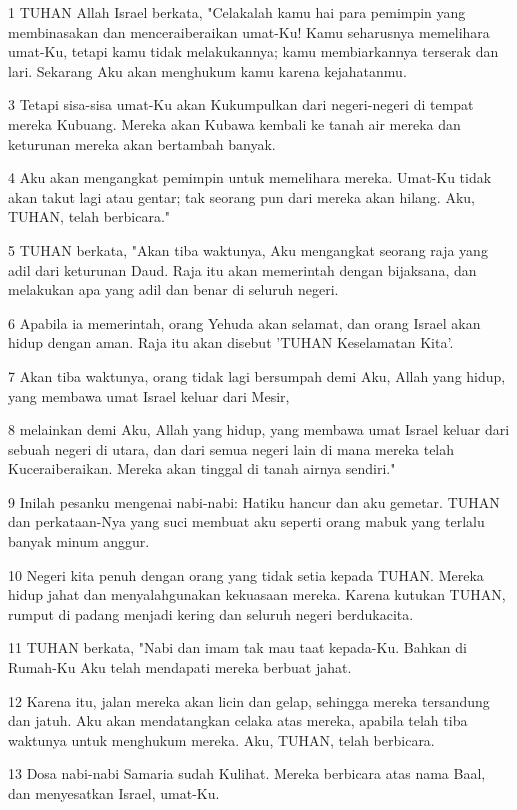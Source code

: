 \par 1 TUHAN Allah Israel berkata, "Celakalah kamu hai para pemimpin yang membinasakan dan menceraiberaikan umat-Ku! Kamu seharusnya memelihara umat-Ku, tetapi kamu tidak melakukannya; kamu membiarkannya terserak dan lari. Sekarang Aku akan menghukum kamu karena kejahatanmu.
\par 3 Tetapi sisa-sisa umat-Ku akan Kukumpulkan dari negeri-negeri di tempat mereka Kubuang. Mereka akan Kubawa kembali ke tanah air mereka dan keturunan mereka akan bertambah banyak.
\par 4 Aku akan mengangkat pemimpin untuk memelihara mereka. Umat-Ku tidak akan takut lagi atau gentar; tak seorang pun dari mereka akan hilang. Aku, TUHAN, telah berbicara."
\par 5 TUHAN berkata, "Akan tiba waktunya, Aku mengangkat seorang raja yang adil dari keturunan Daud. Raja itu akan memerintah dengan bijaksana, dan melakukan apa yang adil dan benar di seluruh negeri.
\par 6 Apabila ia memerintah, orang Yehuda akan selamat, dan orang Israel akan hidup dengan aman. Raja itu akan disebut 'TUHAN Keselamatan Kita'.
\par 7 Akan tiba waktunya, orang tidak lagi bersumpah demi Aku, Allah yang hidup, yang membawa umat Israel keluar dari Mesir,
\par 8 melainkan demi Aku, Allah yang hidup, yang membawa umat Israel keluar dari sebuah negeri di utara, dan dari semua negeri lain di mana mereka telah Kuceraiberaikan. Mereka akan tinggal di tanah airnya sendiri."
\par 9 Inilah pesanku mengenai nabi-nabi: Hatiku hancur dan aku gemetar. TUHAN dan perkataan-Nya yang suci membuat aku seperti orang mabuk yang terlalu banyak minum anggur.
\par 10 Negeri kita penuh dengan orang yang tidak setia kepada TUHAN. Mereka hidup jahat dan menyalahgunakan kekuasaan mereka. Karena kutukan TUHAN, rumput di padang menjadi kering dan seluruh negeri berdukacita.
\par 11 TUHAN berkata, "Nabi dan imam tak mau taat kepada-Ku. Bahkan di Rumah-Ku Aku telah mendapati mereka berbuat jahat.
\par 12 Karena itu, jalan mereka akan licin dan gelap, sehingga mereka tersandung dan jatuh. Aku akan mendatangkan celaka atas mereka, apabila telah tiba waktunya untuk menghukum mereka. Aku, TUHAN, telah berbicara.
\par 13 Dosa nabi-nabi Samaria sudah Kulihat. Mereka berbicara atas nama Baal, dan menyesatkan Israel, umat-Ku.
